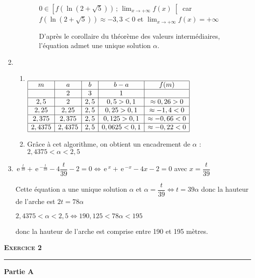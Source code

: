 \documentclass[10pt]{article}
\newcommand{\intfo}[2]{\left[#1 \, ; \, #2\right[} %
\newcommand{\e}{\mathrm{\,e\,}}%
\begin{document}
\begin{enumerate}
\begin{enumerate}
\begin{itemize}
$0\in \intfo{ f(\ln(2+\sqrt{5})) }{ \displaystyle\lim_{x \to + \infty} f(x) } $ car $f(\ln(2+\sqrt{5}))\approx -3,3 <0$ et $\displaystyle\lim_{x \to + \infty} f(x)=+\infty$\smallskip 
			
D'après le corollaire du théorème des valeurs intermédiaires, l'équation admet une unique solution $\alpha$.
		\end{itemize}
	\end{enumerate}
	\item
	\begin{enumerate}
		\item 
$\begin{array}[t]{|*{5}{c|}}\hline
m  & a & b & b-a & f(m) \\ \hline
& 2 & 3 & 1 & \\ \hline
2,5 & 2 & 2,5 & 0,5>0,1 & \approx 0,26 >0 \\ \hline
2,25 & 2,25 & 2,5 & 0,25>0,1 & \approx -1,4 <0 \\ \hline 
2,375 & 2,375 & 2,5 & 0,125>0,1 & \approx -0,66 <0 \\ \hline 
2,4375 & 2,4375 & 2,5 & 0,0625<0,1 & \approx -0,22 <0 \\ \hline 
\end{array}$
		\item Grâce à cet algorithme, on obtient un encadrement de $\alpha$ : $\boxed{ 2,4375 < \alpha < 2,5 }$
	\end{enumerate}
\item $\e^{ \frac{t}{39} } + \e^{- \frac{t}{39} } - 4 \dfrac{t}{39}-2 = 0 \iff \e^x + \e^{-x} -4x-2=0$ avec $x=\dfrac{t}{39}$ \smallskip  
	
	Cette équation a une unique solution $\alpha$ et $\alpha = \dfrac{t}{39} \iff t = 39 \alpha$ donc la hauteur de l'arche est $2t = 78 \alpha$\smallskip 
	
$2,4375 < \alpha < 2,5 \iff 190,125 < 78\alpha < 195$\smallskip 
	
donc la hauteur de l'arche est comprise entre 190 et 195 mètres.
\end{enumerate} \bigskip 

\textbf{\textsc{Exercice 2}} \smallskip  \hrule 

\bigskip 

\textbf{Partie A}

\medskip
\end{document}
